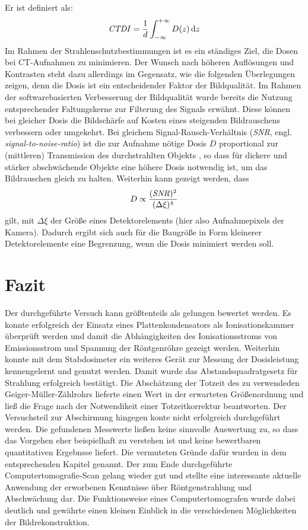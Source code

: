 \documentclass[11pt, a4paper]{article}
\numberwithin{equation}{section}
\begin{document}
Er ist definiert als:
\begin{align}
	\text{\emph{CTDI}}=\frac{1}{d}\int_{-\infty}^{+\infty}D(z)\,\mathrm{d}z
\end{align}
Im Rahmen der Strahlenschutzbestimmungen ist es ein ständiges Ziel, die Dosen bei CT-Aufnahmen zu minimieren.
Der Wunsch nach höheren Auflösungen und Kontrasten steht dazu allerdings im Gegensatz, wie die folgenden Überlegungen zeigen, denn die Dosis ist ein entscheidender Faktor der Bildqualität.
Im Rahmen der softwarebasierten Verbesserung der Bildqualität wurde bereits die Nutzung entsprechender Faltungskerne zur Filterung des Signals erwähnt.
Diese können bei gleicher Dosis die Bildschärfe auf Kosten eines steigenden Bildrauschens verbessern oder umgekehrt.
Bei gleichem Signal-Rausch-Verhältnis (\emph{SNR}, engl. \emph{signal-to-noise-ratio}) ist die zur Aufnahme nötige Dosis $D$ proportional zur (mittleren) Transmission des durchstrahlten Objekts \cite{buzug}, so dass für dickere und stärker abschwächende Objekte eine höhere Dosis notwendig ist, um das Bildrauschen gleich zu halten. 
Weiterhin kann gezeigt werden, dass
\begin{align}
	D \propto \frac{(\text{\emph{SNR}})^2}{(\Delta\xi)^4}
\end{align}
gilt, mit $\Delta\xi$ der Größe eines Detektorelements (hier also Aufnahmepixels der Kamera).
Dadurch ergibt sich auch für die Baugröße in Form kleinerer Detektorelemente eine Begrenzung, wenn die Dosis minimiert werden soll.

\section{Fazit}

Der durchgeführte Versuch kann größtenteils als gelungen bewertet werden.
Es konnte erfolgreich der Einsatz eines Plattenkondensators als Ionisationskammer überprüft werden und damit die Abhängigkeiten des Ionisationsstroms von Emissionsstrom und Spannung der Röntgenröhre gezeigt werden.
Weiterhin konnte mit dem Stabdosimeter ein weiteres Gerät zur Messung der Dosisleistung kennengelernt und genutzt werden.
Damit wurde das Abstandsquadratgesetz für Strahlung erfolgreich bestätigt.
Die Abschätzung der Totzeit des zu verwendeden Geiger-Müller-Zählrohrs lieferte einen Wert in der erwarteten Größenordnung und ließ die Frage nach der Notwendikeit einer Totzeitkorrektur beantworten.
Der Versuchsteil zur Abschirmung hingegen konte nicht erfolgreich durchgeführt werden.
Die gefundenen Messwerte ließen keine sinnvolle Auswertung zu, so dass das Vorgehen eher beispielhaft zu verstehen ist und keine bewertbaren quantitativen Ergebnsse liefert.
Die vermuteten Gründe dafür wurden in dem entsprechenden Kapitel genannt.
Der zum Ende durchgeführte Computertomografie-Scan gelang wieder gut und stellte eine interessante aktuelle Anwendung der erworbenen Kenntnisse über Röntgenstrahlung und Abschwächung dar.
Die Funktionsweise eines Computertomografen wurde dabei deutlich und gewährte einen kleinen Einblick in die verschiedenen Möglichkeiten der Bildrekonstruktion.
\end{document}

